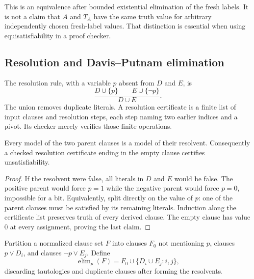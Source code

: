 This is an equivalence after bounded existential elimination of the fresh
labels.  It is not a claim that $A$ and $T_A$ have the same truth value for
arbitrary independently chosen fresh-label values.  That distinction is
essential when using equisatisfiability in a proof checker.

\subsection{Resolution and Davis--Putnam elimination}

The resolution rule, with a variable $p$ absent from $D$ and $E$, is
\[
 \frac{D\cup\{p\}\qquad E\cup\{\neg p\}}{D\cup E}.
\]
The union removes duplicate literals.  A resolution certificate is a finite
list of input clauses and resolution steps, each step naming two earlier
indices and a pivot.  Its checker merely verifies those finite operations.

\begin{lemma}\label{ca-resolution-sound}
Every model of the two parent clauses is a model of their resolvent.
Consequently a checked resolution certificate ending in the empty clause
certifies unsatisfiability.
\end{lemma}
\begin{proof}
If the resolvent were false, all literals in $D$ and $E$ would be false.
The positive parent would force $p=1$ while the negative parent would force
$p=0$, impossible for a bit.  Equivalently, split directly on the value of
$p$: one of the parent clauses must be satisfied by its remaining literals.
Induction along the certificate list preserves truth of every derived clause.
The empty clause has value $0$ at every assignment, proving the last claim.
\end{proof}

Partition a normalized clause set $F$ into clauses $F_0$ not mentioning $p$,
clauses $p\vee D_i$, and clauses $\neg p\vee E_j$.  Define
\[
 \operatorname{elim}_p(F)=F_0\cup\{D_i\cup E_j:i,j\},
\]
discarding tautologies and duplicate clauses after forming the resolvents.

